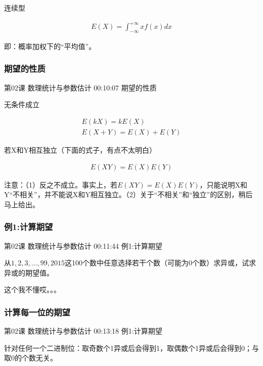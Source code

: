 \documentclass[UTF8]{ctexbook}
\begin{document}
连续型

\begin{equation}
\begin{aligned}
E(X)=\int_{-\infty}^{+\infty} x f(x) dx
\end{aligned}
\end{equation}

即：概率加权下的“平均值”。

\subsubsection{期望的性质}

第02课 数理统计与参数估计 00:10:07 期望的性质

无条件成立

\begin{equation}
\begin{aligned}
E(kX)=kE(X) \\
E(X+Y)=E(X)+E(Y)
\end{aligned}
\end{equation}

若X和Y相互独立（下面的式子，有点不太明白）

\begin{equation}
\begin{aligned}
E(XY)=E(X)E(Y)
\end{aligned}
\end{equation}

注意：（1）反之不成立。事实上，若$E(XY)=E(X)E(Y)$，只能说明X和Y“不相关”，并不能说X和Y相互独立。（2）关于“不相关”和“独立”的区别，稍后马上给出。

\subsubsection{例1:计算期望}

第02课 数理统计与参数估计 00:11:44 例1:计算期望

从$1,2,3,\dots,99,2015$这100个数中任意选择若干个数（可能为0个数）求异或，试求异或的期望值。

这个我不懂哎。。。

\subsubsection{计算每一位的期望}

第02课 数理统计与参数估计 00:13:18 例1:计算期望

针对任何一个二进制位：取奇数个1异或后会得到1，取偶数个1异或后会得到0；与取0的个数无关。
\end{document}
